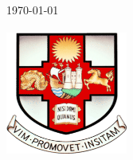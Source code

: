 \begin{titlepage}


{\large \today}\\[3cm] %


\includegraphics[width=4cm, height=5cm]{Images/Misc/bristol_logo.png}\\[1cm] %
 

\vfill %

\end{titlepage}













